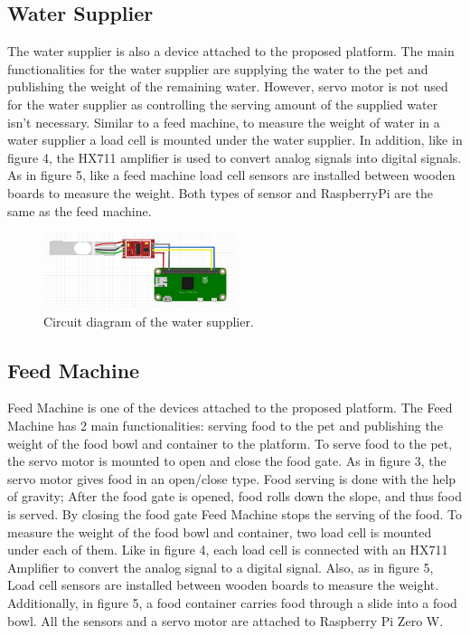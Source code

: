 \documentclass[conference]{IEEEtran}
\begin{document}
\subsection{Water Supplier}
The water supplier is also a device attached to the proposed platform. The main functionalities for the water supplier are supplying the water to the pet and publishing the weight of the remaining water. However, servo motor is not used for the water supplier as controlling the serving amount of the supplied water isn’t necessary. Similar to a feed machine, to measure the weight of water in a water supplier a load cell is mounted under the water supplier. In addition, like in figure 4, the HX711 amplifier is used to convert analog signals into digital signals. As in figure 5, like a feed machine load cell sensors are installed between wooden boards to measure the weight. Both types of sensor and RaspberryPi are the same as the feed machine. 

\begin{figure}[htbp]
\centerline{\includegraphics[width=0.5\textwidth]{./images/water supplier circuit.jpg}}
\caption{Circuit diagram of the water supplier.}
\label{fig}
\end{figure}

\subsection{Feed Machine}
Feed Machine is one of the devices attached to the proposed platform. The Feed Machine has 2 main functionalities: serving food to the pet and publishing the weight of the food bowl and container to the platform. To serve food to the pet, the servo motor is mounted to open and close the food gate. As in figure 3, the servo motor gives food in an open/close type. Food serving is done with the help of gravity; After the food gate is opened, food rolls down the slope, and thus food is served. By closing the food gate Feed Machine stops the serving of the food. To measure the weight of the food bowl and container, two load cell is mounted under each of them. Like in figure 4, each load cell is connected with an HX711 Amplifier to convert the analog signal to a digital signal. Also, as in figure 5, Load cell sensors are installed between wooden boards to measure the weight. Additionally, in figure 5, a food container carries food through a slide into a food bowl. All the sensors and a servo motor are attached to Raspberry Pi Zero W.
\end{document}
